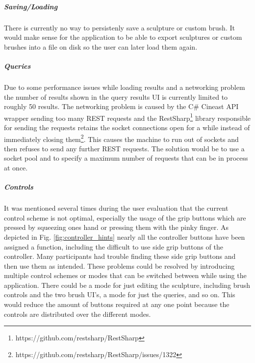 \subparagraph{Saving/Loading}
There is currently no way to persistenly save a sculpture or custom brush. It would make sense for the application to be able to export sculptures or custom brushes into a file on disk so the user can later load them again.

\subparagraph{Queries}
Due to some performance issues while loading results and a networking problem the number of results shown in the query results UI is currently limited to roughly 50 results. The networking problem is caused by the C\# Cineast API wrapper sending too many REST requests and the RestSharp\footnote{https://github.com/restsharp/RestSharp} library responsible for sending the requests retains the socket connections open for a while instead of immediately closing them\footnote{https://github.com/restsharp/RestSharp/issues/1322}. This causes the machine to run out of sockets and then refuses to send any further REST requests. The solution would be to use a socket pool and to specify a maximum number of requests that can be in process at once.

\subparagraph{Controls}
It was mentioned several times during the user evaluation that the current control scheme is not optimal, especially the usage of the grip buttons which are pressed by squeezing ones hand or pressing them with the pinky finger. As depicted in Fig. \ref{fig:controller_hints} nearly all the controller buttons have been assigned a function, including the difficult to use side grip buttons of the controller. Many participants had trouble finding these side grip buttons and then use them as intended. These problems could be resolved by introducing multiple control schemes or modes that can be switched between while using the application. There could be a mode for just editing the sculpture, including brush controls and the two brush UI's, a mode for just the queries, and so on. This would reduce the amount of buttons required at any one point because the controls are distributed over the different modes.
